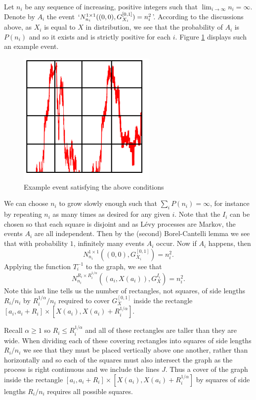 Let $n_i$ be any sequence of increasing, positive integers such that $\lim_{i\to\infty} n_i=\infty$. Denote by $A_i$ the event $`N_{n_i}^{1 \times 1 }((0,0),G_{X_i}^{[0,1]})=n_i^2 $'. According to the discussions above, as $X_i$ is equal to $X$ in distribution, we see that the probability of $A_i$ is $P(n_i)$ and so it exists and is strictly positive for each $i$. Figure \ref{fig:example-rectangle1} displays such an example event. 

\begin{figure}[h]\label{fig:example-rectangle1}
    \centering
    \includegraphics[width=0.6\textwidth]{pics/ch-brownian/event-rectangles.png}
    \caption{Example event satisfying the above conditions}
    \label{fig:example-rectangle1}
\end{figure}

We can choose $n_i$ to grow slowly enough such that $\sum_{i}P(n_i)=\infty$, for instance by repeating $n_i$ as many times as desired for any given $i$. Note that the $I_i$ can be chosen so that each square is disjoint and as L\'evy processes are Markov, the events $A_i$ are all independent. Then by the (second) Borel-Cantelli lemma we see that with probability $1$, infinitely many events $A_i$ occur. Now if $A_i$ happens, then
\[
N_{n_i}^{1 \times 1 }\left((0,0),G_{X_i}^{[0,1]}\right)=n_i^2.
\]
Applying the function $T^{-1}_i$ to the graph, we see that
\[
N_{n_i}^{R_i \times R_i^{1/\alpha} }\left((a_i,X(a_i)),G_{X}^{I_i}\right)=n_i^2.
\]
Note this last line tells us the number of rectangles, not squares, of side lengths $R_i / n_i$ by $R_i^{1/\alpha} / n_i$ required to cover $G_X^{[0,1]}$ inside the rectangle $[a_i, a_i + R_i] \times [X(a_i), X(a_i) + R_i^{1/\alpha}]$. 

Recall $\alpha \ge 1$ so $R_i\leq R_i^{1/\alpha}$ and all of these rectangles are taller than they are wide. When dividing each of these covering rectangles into squares of side lengths $R_i / n_i$ we see that they must be placed vertically above one another, rather than horizontally and so each of the squares must also intersect the graph as the process is right continuous and we include the lines $J$. Thus a cover of the graph inside the rectangle $[a_i, a_i + R_i] \times [X(a_i), X(a_i) + R_i^{1/\alpha}]$ by squares of side lengths $R_i / n_i$ requires all possible squares.

